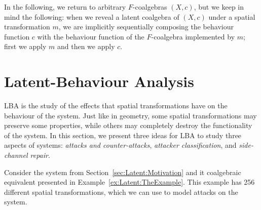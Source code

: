 In the following, we return to arbitrary $F$-coalgebras $(X,c)$, but we keep in mind the following: when we reveal a latent coalgebra of $(X,c)$ under a spatial transformation $m$, we are implicitly sequentially composing the behaviour function $c$ with the behaviour function of the $F$-coalgebra implemented by $m$; first we apply $m$ and then we apply $c$.

\section{Latent-Behaviour Analysis}
LBA is the study of the effects that spatial transformations have on the behaviour of the system. Just like in geometry, some spatial transformations may preserve some properties, while others may completely destroy the functionality of the system. In this section, we present three ideas for LBA to study three aspects of systems: \emph{attacks and counter-attacks}, \emph{attacker classification}, and \emph{side-channel repair}.

Consider the system from Section~\ref{sec:Latent:Motivation} and it coalgebraic equivalent presented in Example~\ref{ex:Latent:TheExample}. This example has 256 different spatial transformations, which we can use to model attacks on the system. 



